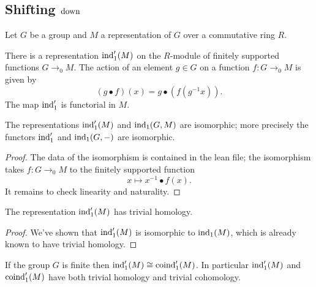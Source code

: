 \subsection{Shifting $\mathrm{down}$}
Let $G$ be a group and $M$ a representation of $G$ over a commutative ring $R$.

\begin{definition} \label{def:ind₁'}
	There is a representation $\mathrm{ind}_1' (M)$ on the $R$-module of finitely supported
	functions $G \to_0 M$.
	The action of an element $g \in G$ on a function $f : G \to_0 M$ is given by
	\[
		(g \bullet f)(x) = g \bullet (f (g^{-1}x)).
	\]
	The map $\mathrm{ind}_1'$ is functorial in $M$.
\end{definition}

\begin{lemma}	\label{lem:ind₁' iso ind₁}
	\leanok
	The representations $\mathrm{ind}_1'(M)$ and $\mathrm{ind}_1(G,M)$ are isomorphic; more precisely the
	functors $\mathrm{ind}_1'$ and $\mathrm{ind}_1(G,-)$ are isomorphic.
\end{lemma}

\begin{proof}
	The data of the isomorphism is contained in the lean file; the isomorphism
	takes $f : G \to_0 M$ to the finitely supported function
	\[
		x \mapsto x^{-1} \bullet f(x).
	\]
	It remains to check linearity and naturality.
\end{proof}

\begin{corollary}	\label{cor:ind₁' trivial homology}
	\leanok
	The representation $\mathrm{ind}_1'(M)$ has trivial homology.
\end{corollary}

\begin{proof}
	\leanok
	We've shown that $\mathrm{ind}_1'(M)$ is isomorphic to $\mathrm{ind}_1(M)$, which is already known to
	have trivial homology.
\end{proof}

\begin{corollary}	\label{cor:ind₁' iso coind₁'}
	\leanok
	If the group $G$ is finite then $\mathrm{ind}_1'(M) \cong \mathrm{coind}_1'(M)$.
	In particular $\mathrm{ind}_1'(M)$ and $\mathrm{coind}_1'(M)$ have both trivial homology and trivial cohomology.
\end{corollary}

